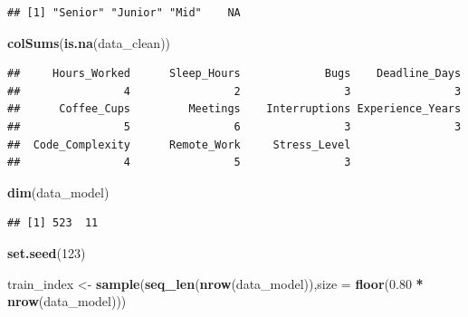 \documentclass[
]{article}
\newenvironment{Shaded}{\begin{snugshade}}{\end{snugshade}}
\newcommand{\AttributeTok}[1]{\textcolor[rgb]{0.13,0.29,0.53}{#1}}
\newcommand{\DecValTok}[1]{\textcolor[rgb]{0.00,0.00,0.81}{#1}}
\newcommand{\FloatTok}[1]{\textcolor[rgb]{0.00,0.00,0.81}{#1}}
\newcommand{\FunctionTok}[1]{\textcolor[rgb]{0.13,0.29,0.53}{\textbf{#1}}}
\newcommand{\NormalTok}[1]{#1}
\newcommand{\OtherTok}[1]{\textcolor[rgb]{0.56,0.35,0.01}{#1}}
\newcommand{\SpecialCharTok}[1]{\textcolor[rgb]{0.81,0.36,0.00}{\textbf{#1}}}
\begin{document}
\begin{verbatim}
## [1] "Senior" "Junior" "Mid"    NA
\end{verbatim}

\begin{Shaded}
\begin{Highlighting}[]
\FunctionTok{colSums}\NormalTok{(}\FunctionTok{is.na}\NormalTok{(data\_clean))}
\end{Highlighting}
\end{Shaded}

\begin{verbatim}
##     Hours_Worked      Sleep_Hours             Bugs    Deadline_Days 
##                4                2                3                3 
##      Coffee_Cups         Meetings    Interruptions Experience_Years 
##                5                6                3                3 
##  Code_Complexity      Remote_Work     Stress_Level 
##                4                5                3
\end{verbatim}

\begin{Shaded}
\end{Shaded}

\begin{Shaded}
\begin{Highlighting}[]
\FunctionTok{dim}\NormalTok{(data\_model)}
\end{Highlighting}
\end{Shaded}

\begin{verbatim}
## [1] 523  11
\end{verbatim}

\begin{Shaded}
\begin{Highlighting}[]
\FunctionTok{set.seed}\NormalTok{(}\DecValTok{123}\NormalTok{)}

\NormalTok{train\_index }\OtherTok{\textless{}{-}} \FunctionTok{sample}\NormalTok{(}\FunctionTok{seq\_len}\NormalTok{(}\FunctionTok{nrow}\NormalTok{(data\_model)),}\AttributeTok{size =} \FunctionTok{floor}\NormalTok{(}\FloatTok{0.80} \SpecialCharTok{*} \FunctionTok{nrow}\NormalTok{(data\_model)))}
\end{Highlighting}
\end{Shaded}
\end{document}
